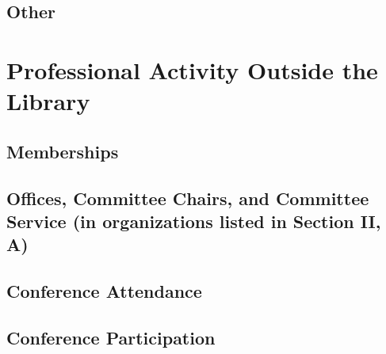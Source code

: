\documentclass[12pt, oneside]{article}
\begin{document}
\subsection{Other}

\section{Professional Activity Outside the Library}

\subsection{Memberships}



\subsection{Offices, Committee Chairs, and Committee Service (in organizations listed in Section II, A)}



\subsection{Conference Attendance}
\subsection{Conference Participation}
\end{document}
